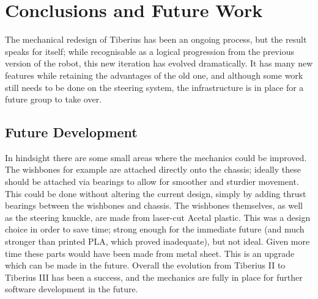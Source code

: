 \section{Conclusions and Future Work}
The mechanical redesign of Tiberius has been an ongoing process, but the result speaks for itself; while recognisable as a logical progression from the previous version of the robot, this new iteration has evolved dramatically. It has many new features while retaining the advantages of the old one, and although some work still needs to be done on the steering system, the infrastructure is in place for a future group to take over.
\newline
\subsection{Future Development}
In hindsight there are some small areas where the mechanics could be improved. The wishbones for example are attached directly onto the chassis; ideally these should be attached via bearings to allow for smoother and sturdier movement. This could be done without altering the current design, simply by adding thrust bearings between the wishbones and chassis.
\newline
The wishbones themselves, as well as the steering knuckle, are made from laser-cut \gls{Acetal} plastic. This was a design choice in order to save time; strong enough for the immediate future (and much stronger than printed PLA, which proved inadequate), but not ideal. Given more time these parts would have been made from metal sheet. This is an upgrade which can be made in the future.
\newline
Overall the evolution from Tiberius II to Tiberius III has been a success, and the mechanics are fully in place for further software development in the future.
